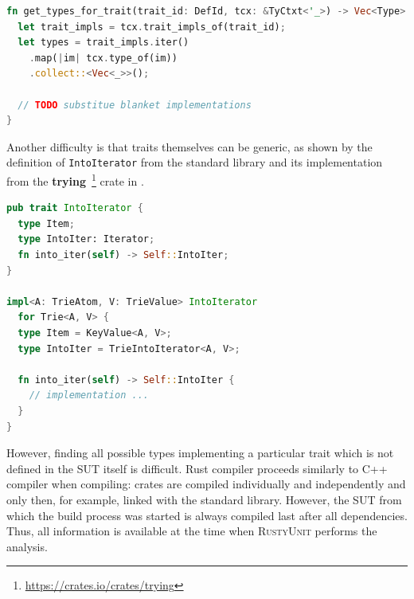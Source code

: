 \documentclass[paper=a4,%
  twoside,%
  BCOR4mm,%
  abstract=true,%
  toc=bibliography,%
  chapterprefix=true,%
  toc=bibliographynumbered,%
  open=right,%
  english,%
  pagesize=pdftex]{scrreprt}
\begin{document}
\begin{lstlisting}[language=Rust, style=boxed, caption={Query types for a trait}, label=lst:query-types-that-implement-trait]
fn get_types_for_trait(trait_id: DefId, tcx: &TyCtxt<'_>) -> Vec<Type> {
  let trait_impls = tcx.trait_impls_of(trait_id);
  let types = trait_impls.iter()
    .map(|im| tcx.type_of(im))
    .collect::<Vec<_>>();

  // TODO substitue blanket implementations
}
\end{lstlisting}

Another difficulty is that traits themselves can be generic, as shown by the definition of \lstinline{IntoIterator} from the standard library and its implementation from the \textbf{trying}~\footnote{\url{https://crates.io/crates/trying}} crate in .

\begin{lstlisting}[language=Rust, style=boxed, caption={IntoIterator implementation in the \textbf{trying} crate}, label=lst:intoiterator-trait]
pub trait IntoIterator {
  type Item;
  type IntoIter: Iterator;
  fn into_iter(self) -> Self::IntoIter;
}

impl<A: TrieAtom, V: TrieValue> IntoIterator
  for Trie<A, V> {
  type Item = KeyValue<A, V>;
  type IntoIter = TrieIntoIterator<A, V>;

  fn into_iter(self) -> Self::IntoIter {
    // implementation ...
  }
}
\end{lstlisting}

However, finding all possible types implementing a particular trait which is not defined in the \ac{SUT} itself is difficult. Rust compiler proceeds similarly to C++ compiler when compiling: crates are compiled individually and independently and only then, for example, linked with the standard library. However, the \ac{SUT} from which the build process was started is always compiled last after all dependencies. Thus, all information is available at the time when \textsc{RustyUnit} performs the analysis. 

\end{document}
